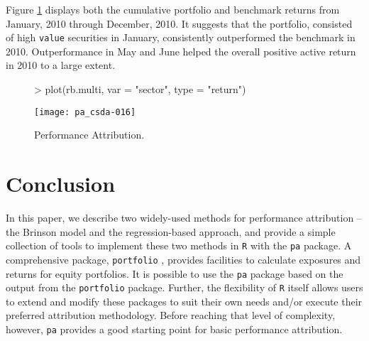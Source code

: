 Figure \ref{figure:regmultiattrib} displays both the cumulative
portfolio and benchmark returns from January, 2010 through December,
2010. It suggests that the portfolio, consisted of high \texttt{value}
securities in January, consistently outperformed the benchmark in
2010. Outperformance in May and June helped the overall positive
active return in 2010 to a large extent.

\begin{figure}
\centering
\vspace*{.1in}
\begin{Schunk}
\begin{Sinput}
> plot(rb.multi, var = "sector", type = "return")
\end{Sinput}
\end{Schunk}
\texttt{[image: pa\_csda-016]}
\caption{\label{figure:regmultiattrib}
  Performance Attribution.}
\end{figure}


\section{Conclusion}

In this paper, we describe two widely-used methods for performance
attribution -- the Brinson model and the regression-based approach,
and provide a simple collection of tools to implement these two
methods in \texttt{R} with the \texttt{pa} package.  A
comprehensive package, \texttt{portfolio} \cite{kane:david}, provides
facilities to calculate exposures and returns for equity
portfolios. It is possible to use the \texttt{pa} package based on the
output from the \texttt{portfolio} package. Further, the flexibility
of \texttt{R} itself allows users to extend and modify these packages
to suit their own needs and/or execute their preferred attribution
methodology. Before reaching that level of complexity, however,
\texttt{pa} provides a good starting point for basic performance
attribution.

%

